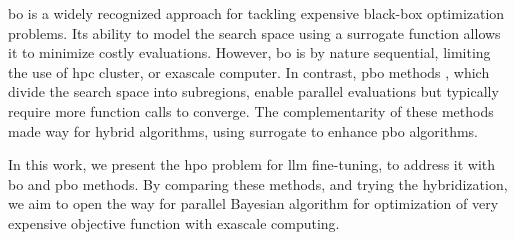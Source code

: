 \acrfull{bo} \cite{shahriari_taking_2016} is a widely recognized approach for tackling expensive black-box optimization problems. Its ability to model the search space using a surrogate function allows it to minimize costly evaluations. However, \acrshort{bo} is by nature sequential, limiting the use of \acrshort{hpc} cluster, or exascale computer.
In contrast, \acrfull{pbo} methods \cite{nakib_deterministic_2017,munos_optimistic_2011}, which divide the search space into subregions, enable parallel evaluations but typically require more function calls to converge. The complementarity of these methods made way for hybrid algorithms, using surrogate to enhance \acrshort{pbo} algorithms.

In this work, we present the \acrshort{hpo} problem for \acrshort{llm} fine-tuning, to address it with \acrlong{bo} and \acrlong{pbo} methods. By comparing these methods, and trying the hybridization, we aim to open the way for parallel Bayesian algorithm for optimization of very expensive objective function with exascale computing.
